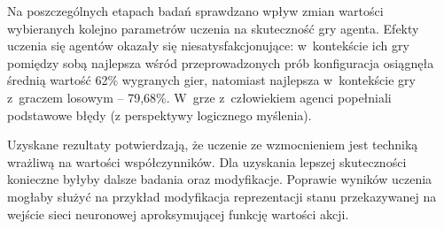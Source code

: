\documentclass[a4paper, 12pt, oneside]{report}
\begin{document}
Na poszczególnych etapach badań sprawdzano wpływ zmian wartości wybieranych kolejno parametrów uczenia na skuteczność gry agenta. Efekty uczenia się agentów okazały się niesatysfakcjonujące: w~kontekście ich gry pomiędzy sobą najlepsza wśród przeprowadzonych prób konfiguracja osiągnęła średnią wartość 62\% wygranych gier, natomiast najlepsza w~kontekście gry z~graczem losowym -- 79,68\%. W~grze z~człowiekiem agenci popełniali podstawowe błędy (z perspektywy logicznego myślenia).

Uzyskane rezultaty potwierdzają, że uczenie ze wzmocnieniem jest techniką wrażliwą na wartości współczynników. Dla uzyskania lepszej skuteczności konieczne byłyby dalsze badania oraz modyfikacje. Poprawie wyników uczenia mogłaby służyć na przykład modyfikacja reprezentacji stanu przekazywanej na wejście sieci neuronowej aproksymującej funkcję wartości akcji.



\end{document}
